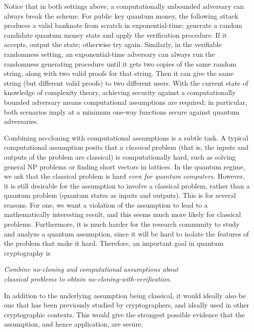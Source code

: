 Notice that in both settings above, a computationally unbounded adversary can always break the scheme.  For public key quantum money, the following attack produces a valid banknote from scratch in exponential-time: generate a random candidate quantum money state and apply the verification procedure.  If it accepts, output the state; otherwise try again.  Similarly, in the verifiable randomness setting, an exponential-time adversary can always run the randomness generating procedure until it gets two copies of the same random string, along with two valid proofs for that string.  Then it can give the same string (but different valid proofs) to two different users.  With the current state of knowledge of complexity theory, achieving security against a computationally bounded adversary means computational assumptions are required; in particular, both scenarios imply at a minimum one-way functions secure against quantum adversaries.  

\medskip

Combining no-cloning with computational assumptions is a subtle task.  A typical computational assumption posits that a \emph{classical} problem (that is, the inputs and outputs of the problem are classical) is computationally hard, such as solving general NP problems or finding short vectors in lattices.  In the quantum regime, we ask that the classical problem is hard \emph{even for quantum computers.}  However, it is still desirable for the assumption to involve a classical problem, rather than a quantum problem (quantum states as inputs and outputs).  This is for several reasons.  For one, we want a violation of the assumption to lead to a mathematically interesting result, and this seems much more likely for classical problems.  Furthermore, it is much harder for the research community to study and analyze a quantum assumption, since it will be hard to isolate the features of the problem that make it hard.  Therefore, an important goal in quantum cryptography is 

\begin{center}{\it Combine no-cloning and computational assumptions about\\ classical problems to obtain no-cloning-with-verification.}
\end{center}

In addition to the underlying assumption being classical, it would ideally also be one that has been previously studied by cryptographers, and ideally used in other cryptographic contexts.  This would give the strongest possible evidence that the assumption, and hence application, are secure.

